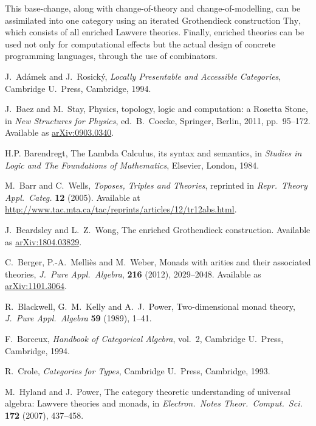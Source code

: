 \documentclass{amsart}
\theoremstyle{definition}
\begin{document}
This base-change, along with change-of-theory and change-of-modelling, can be assimilated into one category using an iterated Grothendieck construction $\mathrm{Thy}$, which consists of all enriched Lawvere theories. Finally, enriched theories can be used not only for computational effects but the actual design of concrete programming languages, through the use of combinators.

\begin{thebibliography}{100}

 J.\ Ad\'{a}mek and J.\ Rosick\'{y}, \textsl{Locally Presentable and Accessible Categories}, Cambridge U.\ Press, Cambridge, 1994.

 J.\ Baez and M.\ Stay, Physics, topology, logic and computation: a Rosetta Stone, in \textsl{New Structures for Physics}, ed.\ B.\ Coecke, Springer, Berlin, 2011, pp.\ 95--172.  Available as \href{https://arxiv.org/abs/0903.0340}{arXiv:0903.0340}.

 H.P. Barendregt, The Lambda Calculus, its syntax and semantics, in \textsl{Studies in Logic and The Foundations of Mathematics}, Elsevier, London, 1984.
	
 M.\ Barr and C.\ Wells, \textsl{Toposes, Triples and Theories}, reprinted in \textsl{Repr.\ Theory Appl.\ Categ.} \textbf{12} (2005).   Available at \href{http://www.tac.mta.ca/tac/reprints/articles/12/tr12abs.html}{http://www.tac.mta.ca/tac/reprints/articles/12/tr12abs.html}.

 J.\ Beardsley and L.\ Z.\ Wong, The enriched Grothendieck construction.  Available as \href{https://arxiv.org/abs/1804.03829}{arXiv:1804.03829}.
	
 C.\ Berger, P.-A.\ Melli\`es and M.\ Weber, Monads with arities and their associated theories, \textsl{J.\ Pure Appl.\ Algebra}, \textbf{216} (2012), 2029--2048.  Available as \href{https://arxiv.org/abs/1101.3064}{arXiv:1101.3064}.

 R.\ Blackwell, G.\ M.\ Kelly and A.\ J.\ Power, Two-dimensional monad theory, 
\textsl{J.\ Pure Appl.\ Algebra} \textbf{59} (1989), 1--41. 
 
 F.\ Borceux, \textsl{Handbook of Categorical Algebra}, vol.\ 2, Cambridge U.\ Press, Cambridge, 1994.

 R.\ Crole, \textsl{Categories for Types}, Cambridge U.\ Press, Cambridge, 1993.

 M.\ Hyland and J.\ Power, The category theoretic understanding of 
universal algebra: Lawvere theories and monads, in \textsl{Electron.\ Notes Theor.\ Comput.\ 
Sci.} \textbf{172} (2007), 437--458.


\end{thebibliography}
\end{document}

